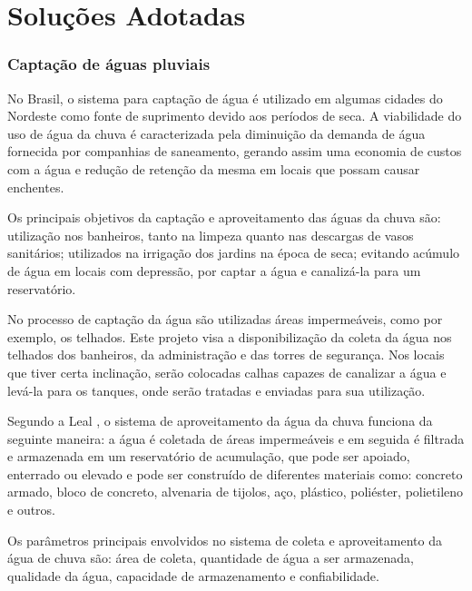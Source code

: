 \chapter[Soluções Adotadas]{Soluções Adotadas}

\subsection{Capta\c{c}\~ao de \'aguas pluviais}

	No Brasil, o sistema para capta\c{c}\~ao de \'agua \'e utilizado em algumas cidades do Nordeste como fonte de suprimento devido aos per\'iodos de seca. A viabilidade do uso de \'agua da chuva \'e caracterizada pela diminui\c{c}\~ao da demanda de \'agua fornecida por companhias de saneamento, gerando assim uma economia de custos com a \'agua e redu\c{c}\~ao de reten\c{c}\~ao da mesma em locais que possam causar enchentes. \cite{MAY} 

	Os principais objetivos da capta\c{c}\~ao e aproveitamento das \'aguas da chuva s\~ao: utiliza\c{c}\~ao nos banheiros, tanto na limpeza quanto nas descargas de vasos sanit\'arios; utilizados na irriga\c{c}\~ao dos jardins na \'epoca de seca; evitando ac\'umulo de \'agua em locais com depress\~ao, por captar a \'agua e canaliz\'a-la para um reservat\'orio.
	
	No processo de capta\c{c}\~ao da \'agua s\~ao utilizadas \'areas imperme\'aveis, como por exemplo, os telhados. Este projeto visa a disponibiliza\c{c}\~ao da coleta da \'agua nos telhados dos banheiros, da administra\c{c}\~ao e das torres de seguran\c{c}a. Nos locais que tiver certa inclina\c{c}\~ao, ser\~ao colocadas calhas capazes de canalizar a \'agua e lev\'a-la para os tanques, onde ser\~ao tratadas e enviadas para sua utiliza\c{c}\~ao. \cite{MAY} 
	
	Segundo a Leal \cite{LEAL}, o sistema de aproveitamento da \'agua da chuva funciona da seguinte maneira: a \'agua \'e coletada de \'areas imperme\'aveis e em seguida \'e filtrada e armazenada em um reservat\'orio de acumula\c{c}\~ao, que pode ser apoiado, enterrado ou elevado e pode ser constru\'ido de diferentes materiais como: concreto armado, bloco de concreto, alvenaria de tijolos, a\c{c}o, pl\'astico, poli\'ester, polietileno e outros.

	Os par\^ametros principais envolvidos no sistema de coleta e aproveitamento da \'agua de chuva s\~ao: \'area de coleta, quantidade de \'agua a ser armazenada, qualidade da \'agua, capacidade de armazenamento e confiabilidade.

